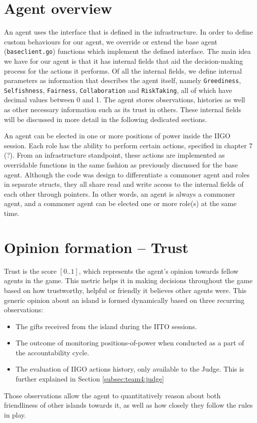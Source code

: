 \section{Agent overview}
An agent uses the interface that is defined in the infrastructure. In order to define custom behaviours for our agent, we override or extend the base agent (\texttt{baseclient.go}) functions which implement the defined interface. The main idea we have for our agent is that it has internal fields that aid the decision-making process for the actions it performs. Of all the internal fields, we define internal parameters as information that describes the agent itself, namely \texttt{Greediness}, \texttt{Selfishness}, \texttt{Fairness}, \texttt{Collaboration} and \texttt{RiskTaking}, all of which have decimal values between 0 and 1. The agent stores observations, histories as well as other necessary information such as its trust in others. These internal fields will be discussed in more detail in the following dedicated sections. %


An agent can be elected in one or more positions of power inside the IIGO session. Each role has the ability to perform certain actions, specified in chapter 7 (?). From an infrastructure standpoint, these actions are implemented as overridable functions in the same fashion as previously discussed for the base agent. Although the code was design to differentiate a commoner agent and roles in separate structs, they all share read and write access to the internal fields of each other through pointers. In other words, an agent is always a commoner agent, and a commoner agent can be elected one or more role(s) at the same time.

\section{Opinion formation -- Trust}
\label{sec:team4:trust}
Trust is the score $[0..1]$, which represents the agent's opinion towards fellow agents in the game. This metric helps it in making decisions throughout the game based on how trustworthy, helpful or friendly it believes other agents were. This generic opinion about an island is formed dynamically based on three recurring observations:
\begin{itemize}
    \item The gifts received from the island during the IITO sessions.
    \item The outcome of monitoring positions-of-power when conducted as a part of the accountability cycle.
    \item The evaluation of IIGO actions history, only available to the Judge. This is further explained in Section \ref{subsec:team4:judge}
\end{itemize}
Those observations allow the agent to quantitatively reason about both friendliness of other islands towards it, as well as how closely they follow the rules in play.

